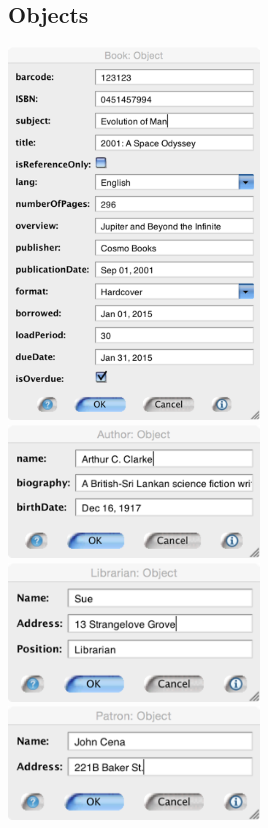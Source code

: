 \documentclass[12pt]{article}
\begin{document}
\subsection{Objects}
\includegraphics[width=0.5\textwidth]{obj_book}
\includegraphics[width=0.5\textwidth]{obj_author}
\includegraphics[width=0.5\textwidth]{obj_librarian}
\includegraphics[width=0.5\textwidth]{obj_patron}
\end{document}
